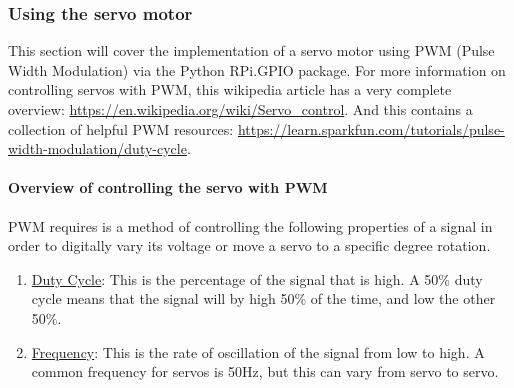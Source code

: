 \documentclass{article}
\begin{document}
  \subsubsection{Using the servo motor}
  This section will cover the implementation of a servo motor using PWM (Pulse Width Modulation) via the Python RPi.GPIO package. For more information on controlling servos with PWM, this wikipedia article has a very complete overview: \href{https://en.wikipedia.org/wiki/Servo\_control}{https://en.wikipedia.org/wiki/Servo\_control}. And this contains a collection of helpful PWM resources: \href{https://learn.sparkfun.com/tutorials/pulse-width-modulation/duty-cycle}{https://learn.sparkfun.com/tutorials/pulse-width-modulation/duty-cycle}.

    \paragraph{Overview of controlling the servo with PWM}
    PWM requires is a method of controlling the following properties of a signal in order to digitally vary its voltage or move a servo to a specific degree rotation.
    \begin{enumerate}
      \item \underline{Duty Cycle}: This is the percentage of the signal that is high. A 50\% duty cycle means that the signal will by high 50\% of the time, and low the other 50\%.
      \item \underline{Frequency}: This is the rate of oscillation of the signal from low to high. A common frequency for servos is 50Hz, but this can vary from servo to servo.
    \end{enumerate}
\end{document}
